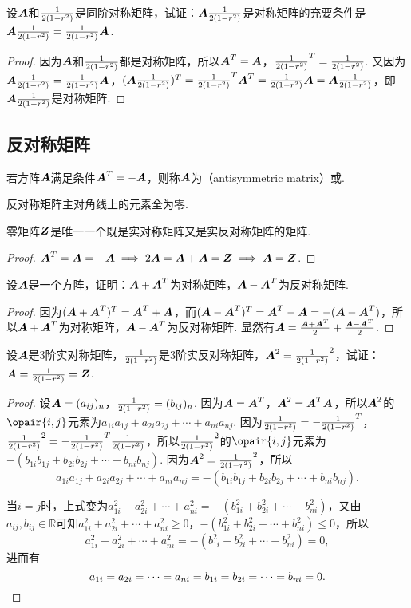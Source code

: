 \begin{example}
设\(\A\)和\(\B\)是同阶对称矩阵，试证：\(\A\B\)是对称矩阵的充要条件是\(\A\B = \B\A\).
\begin{proof}
因为\(\A\)和\(\B\)都是对称矩阵，所以\(\A^T = \A\)，\(\B^T = \B\).
又因为\(\A\B = \B\A\)，\((\A\B)^T = \B^T \A^T = \B\A = \A\B\)，即\(\A\B\)是对称矩阵.
\end{proof}
\end{example}

\subsection{反对称矩阵}
\begin{definition}
若方阵\(\A\)满足条件\(\A^T = -\A\)，则称\(\A\)为（antisymmetric matrix）或.
\end{definition}

\begin{property}
反对称矩阵主对角线上的元素全为零.
\end{property}

\begin{example}
零矩阵\(\z\)是唯一一个既是实对称矩阵又是实反对称矩阵的矩阵.
\begin{proof}
\(\A^T = \A = -\A \implies 2\A = \A+\A = \z \implies \A = \z\).
\end{proof}
\end{example}

\begin{example}
设\(\A\)是一个方阵，证明：\(\A+\A^T\)为对称矩阵，\(\A-\A^T\)为反对称矩阵.
\begin{proof}
因为\((\A+\A^T)^T = \A^T+\A\)，而\((\A-\A^T)^T = \A^T - \A = -(\A-\A^T)\)，所以\(\A+\A^T\)为对称矩阵，\(\A-\A^T\)为反对称矩阵.
显然有\(\A = \frac{\A + \A^T}{2} + \frac{\A - \A^T}{2}\).
\end{proof}
\end{example}

\begin{example}
设\(\A\)是3阶实对称矩阵，\(\B\)是3阶实反对称矩阵，\(\A^2 = \B^2\)，试证：\(\A = \B = \z\).
\begin{proof}
设\(\A = (a_{ij})_n\)，\(\B = (b_{ij})_n\).
因为\(\A = \A^T\)，\(\A^2 = \A^T \A\)，所以\(\A^2\)的\(\opair{i,j}\)元素为\(a_{1i} a_{1j} + a_{2i} a_{2j} + \dotsb + a_{ni} a_{nj}\).
因为\(\B = -\B^T\)，\(\B^2 = -\B^T \B\)，所以\(\B^2\)的\(\opair{i,j}\)元素为\(-(b_{1i} b_{1j} + b_{2i} b_{2j} + \dotsb + b_{ni} b_{nj})\).
因为\(\A^2 = \B^2\)，所以\[
a_{1i} a_{1j} + a_{2i} a_{2j} + \dotsb + a_{ni} a_{nj}
= -(b_{1i} b_{1j} + b_{2i} b_{2j} + \dotsb + b_{ni} b_{nj}).
\]

当\(i=j\)时，上式变为\(
a_{1i}^2 + a_{2i}^2 + \dotsb + a_{ni}^2
= -(b_{1i}^2 + b_{2i}^2 + \dotsb + b_{ni}^2)
\)，又由\(a_{ij},b_{ij} \in \mathbb{R}\)可知\(a_{1i}^2 + a_{2i}^2 + \dotsb + a_{ni}^2 \geq 0\)，\(-(b_{1i}^2 + b_{2i}^2 + \dotsb + b_{ni}^2) \leq 0\)，所以\[
a_{1i}^2 + a_{2i}^2 + \dotsb + a_{ni}^2
= -(b_{1i}^2 + b_{2i}^2 + \dotsb + b_{ni}^2) = 0,
\]进而有\[
a_{1i} = a_{2i} = \dotsb = a_{ni} = b_{1i} = b_{2i} = \dotsb = b_{ni} = 0.
\qedhere
\]
\end{proof}
\end{example}

